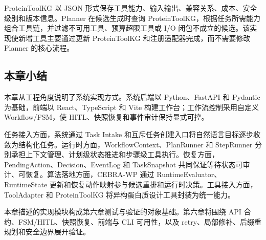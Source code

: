 ProteinToolKG 以 JSON
形式保存工具能力、输入输出、兼容关系、成本、安全级别和版本信息。Planner
在候选生成时查询
ProteinToolKG，根据任务所需能力组合工具链，并过滤不可用工具、预算超限工具或
I/O 闭包不成立的候选。该实现使新增工具主要通过更新 ProteinToolKG
和注册适配器完成，而不需要修改 Planner 的核心流程。

\subsection{本章小结}\label{system-implementation-summary}

本章从工程角度说明了系统实现方式。系统后端以 Python、FastAPI 和 Pydantic
为基础，前端以 React、TypeScript 和 Vite
构建工作台；工作流控制采用自定义 Workflow/FSM，使
HITL、快照恢复和事件审计保持显式可控。

任务接入方面，系统通过 Task Intake
和互斥任务创建入口将自然语言目标逐步收敛为结构化任务。运行时方面，WorkflowContext、PlanRunner
和 StepRunner
分别承担上下文管理、计划级状态推进和步骤级工具执行。恢复方面，PendingAction、Decision、EventLog
和 TaskSnapshot 共同保证等待状态可审计、可恢复。算法落地方面，CEBRA-WP
通过 RuntimeEvaluator、RuntimeState
更新和恢复动作映射参与候选重排和运行时决策。工具接入方面，ToolAdapter 和
ProteinToolKG 将异构蛋白质设计工具封装为统一能力。

本章描述的实现模块构成第六章测试与验证的对象基础。第六章将围绕 API
合约、FSM/HITL、快照恢复、前端与 CLI 可用性，以及
retry、局部修补、后缀重规划和安全边界展开验证。

